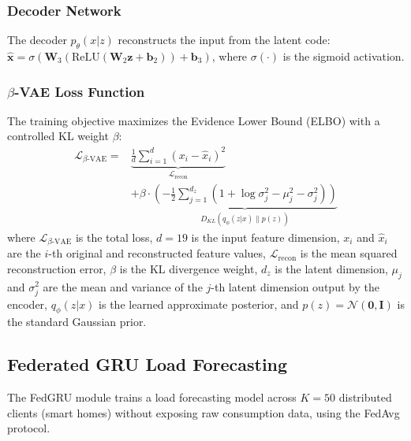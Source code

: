 \documentclass[journal]{IEEEtran}
\begin{document}
\subsubsection{Decoder Network} The decoder $p_\theta(x|z)$ reconstructs the input from the latent code: $\hat{\mathbf{x}} = \sigma(\mathbf{W}_3(\text{ReLU}(\mathbf{W}_2 \mathbf{z} + \mathbf{b}_2)) + \mathbf{b}_3)$, where $\sigma(\cdot)$ is the sigmoid activation.

\subsubsection{$\beta$-VAE Loss Function} The training objective maximizes the Evidence Lower Bound (ELBO) with a controlled KL weight $\beta$:
\begin{equation}
\begin{aligned}
    \mathcal{L}_{\beta\text{-VAE}} = & \underbrace{\frac{1}{d}\sum_{i=1}^{d}(x_i - \hat{x}_i)^2}_{\mathcal{L}_{\text{recon}}} \\
    & + \beta \cdot \underbrace{\left(-\frac{1}{2}\sum_{j=1}^{d_z}\left(1 + \log\sigma_j^2 - \mu_j^2 - \sigma_j^2\right)\right)}_{D_{KL}(q_\phi(z|x) \| p(z))}
\end{aligned}
    \label{eq:vae_loss}
\end{equation}
where $\mathcal{L}_{\beta\text{-VAE}}$ is the total loss, $d = 19$ is the input feature dimension, $x_i$ and $\hat{x}_i$ are the $i$-th original and reconstructed feature values, $\mathcal{L}_{\text{recon}}$ is the mean squared reconstruction error, $\beta$ is the KL divergence weight, $d_z$ is the latent dimension, $\mu_j$ and $\sigma_j^2$ are the mean and variance of the $j$-th latent dimension output by the encoder, $q_\phi(z|x)$ is the learned approximate posterior, and $p(z) = \mathcal{N}(\mathbf{0}, \mathbf{I})$ is the standard Gaussian prior.

\subsection{Federated GRU Load Forecasting}

The FedGRU module trains a load forecasting model across $K = 50$ distributed clients (smart homes) without exposing raw consumption data, using the FedAvg protocol.
\end{document}
